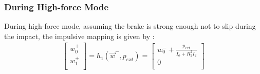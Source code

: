 \subsubsection{During High-force Mode}

During high-force mode, assuming the brake is strong enough not to slip during the impact, the impulsive mapping is given by :
%
\begin{align}
\left[
\begin{array}{c}
w_0^+ \\
w_1^+ \\
\end{array}
\right] = h_1( \vec{w}^- , p_{ext} ) = 
\left[
\begin{array}{c}
w_0^- + \frac{ p_{ext} }{I_o + R_2^2  I_2 } \\
0 \\
\end{array}
\right] 
\label{eq:h1}
\end{align}


